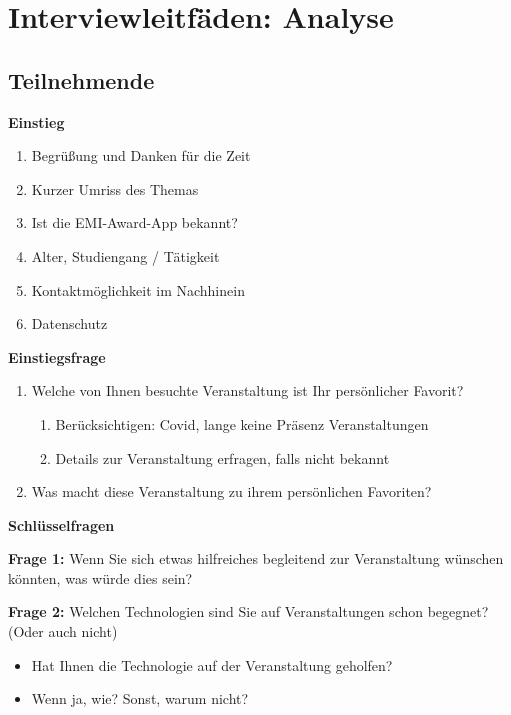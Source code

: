\setlength{\parskip}{2pt}

\chapter{Interviewleitfäden: Analyse} \label{appendix:interview}

\section{Teilnehmende}


\textbf{\large Einstieg}

\begin{enumerate}[noitemsep,topsep=0pt]
    \item Begrüßung und Danken für die Zeit
    \item Kurzer Umriss des Themas
    \item Ist die EMI-Award-App bekannt?
    \item Alter, Studiengang / Tätigkeit
    \item Kontaktmöglichkeit im Nachhinein
    \item Datenschutz
\end{enumerate}


\textbf{\large Einstiegsfrage}

\begin{enumerate}[noitemsep,topsep=0pt]
    \item {
        Welche von Ihnen besuchte Veranstaltung ist Ihr persönlicher Favorit?
        \begin{enumerate}[noitemsep,topsep=0pt]
            \item Berücksichtigen: Covid, lange keine Präsenz Veranstaltungen
            \item Details zur Veranstaltung erfragen, falls nicht bekannt
        \end{enumerate}
        }
    \item Was macht diese Veranstaltung zu ihrem persönlichen Favoriten?
\end{enumerate}


\textbf{\large Schlüsselfragen}

\textbf{Frage 1:} Wenn Sie sich etwas hilfreiches begleitend zur Veranstaltung wünschen könnten, was würde dies sein?

\textbf{Frage 2:} Welchen Technologien sind Sie auf Veranstaltungen schon begegnet? (Oder auch nicht)
\begin{itemize}[noitemsep,topsep=0pt]
    \item Hat Ihnen die Technologie auf der Veranstaltung geholfen?
    \item Wenn ja, wie? Sonst, warum nicht?
\end{itemize}

